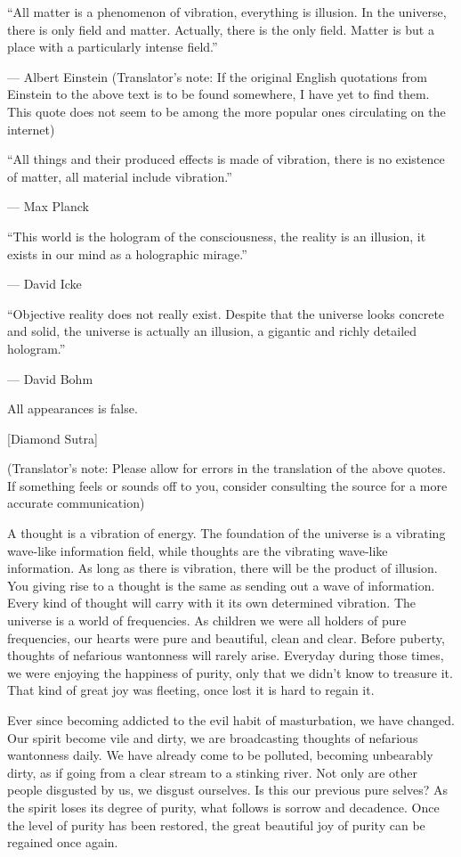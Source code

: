 \documentclass[
]{book}
\begin{document}
``All matter is a phenomenon of vibration, everything is illusion. In the universe, there is only field and matter. Actually, there is the only field. Matter is but a place with a particularly intense field.''

--- Albert Einstein (Translator's note: If the original English quotations from Einstein to the above text is to be found somewhere, I have yet to find them. This quote does not seem to be among the more popular ones circulating on the internet)

``All things and their produced effects is made of vibration, there is no existence of matter, all material include vibration.''

--- Max Planck

``This world is the hologram of the consciousness, the reality is an illusion, it exists in our mind as a holographic mirage.''

--- David Icke

``Objective reality does not really exist. Despite that the universe looks concrete and solid, the universe is actually an illusion, a gigantic and richly detailed hologram.''

--- David Bohm

All appearances is false.

{[}Diamond Sutra{]}

(Translator's note: Please allow for errors in the translation of the above quotes. If something feels or sounds off to you, consider consulting the source for a more accurate communication)

A thought is a vibration of energy. The foundation of the universe is a vibrating wave-like information field, while thoughts are the vibrating wave-like information. As long as there is vibration, there will be the product of illusion. You giving rise to a thought is the same as sending out a wave of information. Every kind of thought will carry with it its own determined vibration. The universe is a world of frequencies. As children we were all holders of pure frequencies, our hearts were pure and beautiful, clean and clear. Before puberty, thoughts of nefarious wantonness will rarely arise. Everyday during those times, we were enjoying the happiness of purity, only that we didn't know to treasure it. That kind of great joy was fleeting, once lost it is hard to regain it.

Ever since becoming addicted to the evil habit of masturbation, we have changed. Our spirit become vile and dirty, we are broadcasting thoughts of nefarious wantonness daily. We have already come to be polluted, becoming unbearably dirty, as if going from a clear stream to a stinking river. Not only are other people disgusted by us, we disgust ourselves. Is this our previous pure selves? As the spirit loses its degree of purity, what follows is sorrow and decadence. Once the level of purity has been restored, the great beautiful joy of purity can be regained once again.
\end{document}
